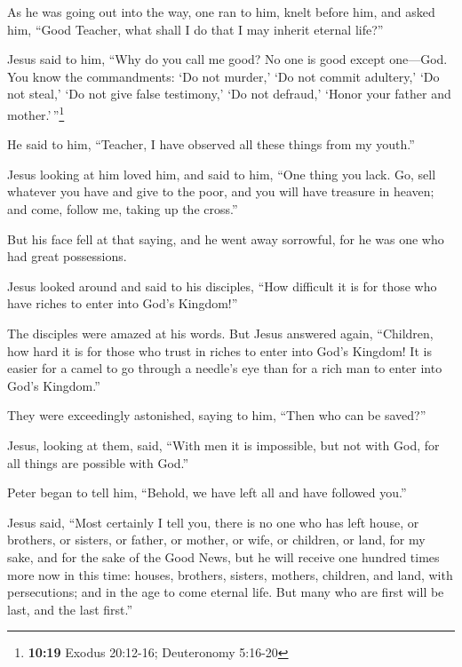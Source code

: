 \begin{paracol}{2}
\begin{otherlanguage}{english}
 As he was going out into the way, one ran to him, knelt
before him, and asked him, ``Good Teacher, what shall I do that I may
inherit eternal life?''

 Jesus said to him, ``Why do you call me good? No one is
good except one---God.  You know the commandments: `Do
not murder,' `Do not commit adultery,' `Do not steal,' `Do not give
false testimony,' `Do not defraud,' `Honor your father and
mother.'\,''\footnote{\textbf{10:19} Exodus 20:12-16; Deuteronomy
  5:16-20}

 He said to him, ``Teacher, I have observed all these
things from my youth.''

 Jesus looking at him loved him, and said to him, ``One
thing you lack. Go, sell whatever you have and give to the poor, and you
will have treasure in heaven; and come, follow me, taking up the
cross.''

 But his face fell at that saying, and he went away
sorrowful, for he was one who had great possessions.

 Jesus looked around and said to his disciples, ``How
difficult it is for those who have riches to enter into God's Kingdom!''

 The disciples were amazed at his words. But Jesus
answered again, ``Children, how hard it is for those who trust in riches
to enter into God's Kingdom!  It is easier for a camel to
go through a needle's eye than for a rich man to enter into God's
Kingdom.''

 They were exceedingly astonished, saying to him, ``Then
who can be saved?''

 Jesus, looking at them, said, ``With men it is
impossible, but not with God, for all things are possible with God.''

 Peter began to tell him, ``Behold, we have left all and
have followed you.''

 Jesus said, ``Most certainly I tell you, there is no one
who has left house, or brothers, or sisters, or father, or mother, or
wife, or children, or land, for my sake, and for the sake of the Good
News,  but he will receive one hundred times more now in
this time: houses, brothers, sisters, mothers, children, and land, with
persecutions; and in the age to come eternal life.  But
many who are first will be last, and the last first.''


\end{otherlanguage}
\end{paracol}
